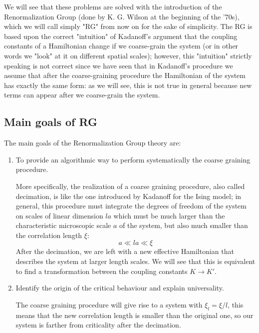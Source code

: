 \documentclass[../../Main/Main.tex]{subfiles}
\begin{document}
We will see that these problems are solved with the introduction of the Renormalization Group (done by K. G. Wilson at the beginning of the '70s), which we will call simply "RG" from now on for the sake of simplicity. The RG is based upon the correct "intuition" of Kadanoff's argument that the coupling constants of a Hamiltonian change if we coarse-grain the system (or in other words we "look" at it on different spatial scales); however, this "intuition" strictly speaking is not correct since we have seen that in Kadanoff's procedure we assume that after the coarse-graining procedure the Hamiltonian of the system has exactly the same form: as we will see, this is not true in general because new terms can appear after we coarse-grain the system.

\subsection{Main goals of RG}
The main goals of the Renormalization Group theory are:
\begin{enumerate}
\item To provide an algorithmic way to perform systematically the coarse graining procedure.

More specifically, the realization of a coarse graining procedure, also called decimation, is like the one introduced by Kadanoff for the Ising model; in general, this procedure must integrate the degrees of freedom of the system on scales of linear dimension \( la \)  which must be much larger than the characteristic microscopic scale \( a \) of the system, but also much smaller than the correlation length \( \xi  \):
\begin{equation*}
  a \ll la \ll \xi
\end{equation*}
 After the decimation, we are left with a new effective Hamiltonian that describes the system at larger length scales. We will see that this is equivalent to find a transformation between the coupling constants \( K \rightarrow K' \).

\item Identify the origin of the critical behaviour and explain universality.

The coarse graining procedure will give rise to a system with \( \xi_l = \xi /l \),
this means that the new correlation length is smaller than the original one, so our system is farther from criticality after the decimation.

\end{enumerate}
\end{document}
